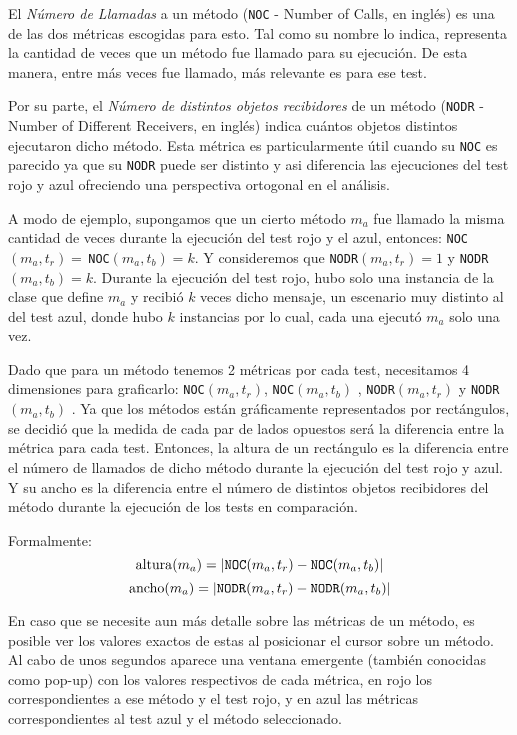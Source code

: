 \par El \emph{Número de Llamadas} a un método ({\tt NOC} - Number of Calls, en inglés) es una de las dos métricas escogidas para esto. Tal como su nombre lo indica, representa la cantidad de veces que un método fue llamado para su ejecución. De esta manera, entre más veces fue llamado, más relevante es para ese test.

\par Por su parte, el \emph{Número de distintos objetos recibidores} de un método ({\tt NODR} - Number of Different Receivers, en inglés) indica cuántos objetos distintos ejecutaron dicho método. Esta métrica es particularmente útil cuando su {\tt NOC} es parecido ya que su {\tt NODR} puede ser distinto y asi diferencia las ejecuciones del test rojo y azul ofreciendo una perspectiva ortogonal en el análisis.

\par A modo de ejemplo, supongamos que un cierto método $m_a$ fue llamado la misma cantidad de veces durante la ejecución del test rojo y el azul, entonces: {\tt NOC}$(m_a,t_r) = \,${\tt NOC}$(m_a,t_b) = k$. Y consideremos que {\tt NODR}$(m_a,t_r) = 1$ y {\tt NODR}$(m_a,t_b) = k$. Durante la ejecución del test rojo, hubo solo una instancia de la clase que define $m_a$ y recibió $k$ veces dicho mensaje, un escenario muy distinto al del test azul, donde hubo $k$ instancias por lo cual, cada una ejecutó $m_a$ solo una vez.

\par Dado que para un método tenemos 2 métricas por cada test, necesitamos 4 dimensiones para graficarlo: {\tt NOC}$(m_a,t_r)$, {\tt NOC}$(m_a,t_b)$ , {\tt NODR}$(m_a,t_r)$ y {\tt NODR}$(m_a,t_b)$ . Ya que los métodos están gráficamente representados por rectángulos, se decidió que la medida de cada par de lados opuestos será la diferencia entre la métrica para cada test. Entonces, la altura de un rectángulo es la diferencia entre el número de llamados de dicho método durante la ejecución del test rojo y azul. Y su ancho es la diferencia entre el número de distintos objetos recibidores del método durante la ejecución de los tests en comparación. 

\par Formalmente:
\[ {\rm altura}(m_a) = \vert {\tt NOC}(m_a,t_r) - {\tt NOC}(m_a,t_b) \vert \]
\[ {\rm ancho}(m_a) = \vert {\tt NODR}(m_a,t_r) - {\tt NODR}(m_a,t_b) \vert \]


\par En caso que se necesite aun más detalle sobre las métricas de un método, es posible ver los valores exactos de estas al posicionar el cursor sobre un método. Al cabo de unos segundos aparece una ventana emergente (también conocidas como pop-up) con los valores respectivos de cada métrica, en rojo los correspondientes a ese método y el test rojo, y en azul las métricas correspondientes al test azul y el método seleccionado.

